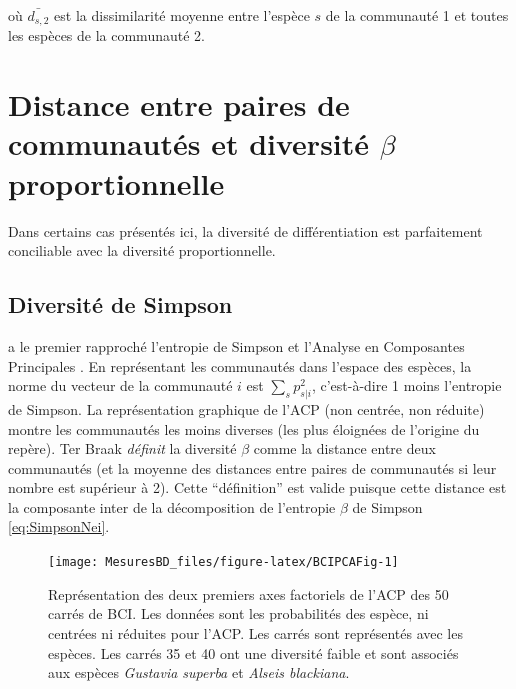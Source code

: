 \documentclass[
  11pt,
  french,
  a4paper,
  extrafontsizes,onecolumn,openright
  ]{memoir}
\newlength{\rf}
\begin{document}
où \(\bar{d_{s,2}}\) est la dissimilarité moyenne entre l'espèce \(s\) de la communauté 1 et toutes les espèces de la communauté 2.

\section{\texorpdfstring{Distance entre paires de communautés et diversité \(\beta\) proportionnelle}{Distance entre paires de communautés et diversité \textbackslash beta proportionnelle}}\label{distance-entre-paires-de-communautuxe9s-et-diversituxe9-beta-proportionnelle}

Dans certains cas présentés ici, la diversité de différentiation est parfaitement conciliable avec la diversité proportionnelle.

\subsection{Diversité de Simpson}\label{diversituxe9-de-simpson}

\textcite{terBraak1983} a le premier rapproché l'entropie de Simpson et l'Analyse en Composantes Principales \autocite{Pearson1901}.
En représentant les communautés dans l'espace des espèces, la norme du vecteur de la communauté \(i\) est \({\sum_s{p_{s|i}^2}}\), c'est-à-dire 1 moins l'entropie de Simpson.
La représentation graphique de l'ACP (non centrée, non réduite) montre les communautés les moins diverses (les plus éloignées de l'origine du repère).
Ter Braak \emph{définit} la diversité \(\beta\) comme la distance entre deux communautés (et la moyenne des distances entre paires de communautés si leur nombre est supérieur à 2).
Cette ``définition'' est valide puisque cette distance est la composante inter de la décomposition de l'entropie \(\beta\) de Simpson \eqref{eq:SimpsonNei}.



\scriptsize

\begin{figure}

{\centering \texttt{[image: MesuresBD\_files/figure-latex/BCIPCAFig-1]} 

}

\caption{Représentation des deux premiers axes factoriels de l'ACP des 50 carrés de BCI. Les données sont les probabilités des espèce, ni centrées ni réduites pour l'ACP. Les carrés sont représentés avec les espèces. Les carrés 35 et 40 ont une diversité faible et sont associés aux espèces \emph{Gustavia superba} et \emph{Alseis blackiana}.}\label{fig:BCIPCAFig}
\end{figure}
\end{document}
